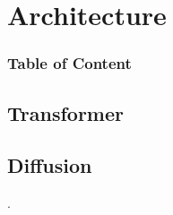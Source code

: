 \documentclass[8pt]{beamer}
\begin{document}
\section{Architecture}
\begingroup
    \begin{frame}
        \frametitle{Table of Content}
        \tableofcontents
    \end{frame}
\endgroup
\subsection{Transformer}


\subsection{Diffusion}

\begin{frame}{.}

\end{frame}
\end{document}
